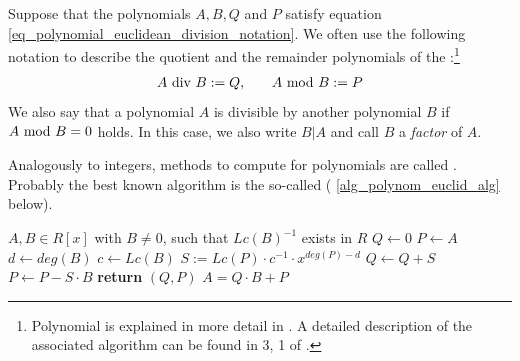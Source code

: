 \begin{notation}
\label{notation_polynomial_euclidean_division_notation}
Suppose that the polynomials $ A, B, Q $ and $ P $ satisfy equation \ref{eq_polynomial_euclidean_division_notation}. We often use the following notation to describe the quotient and the remainder polynomials of the :\footnote{Polynomial  is explained in more detail in \cite{mignotte-1992}. A detailed description of the associated algorithm can be found in \chaptname{} 3, \secname{} 1 of \cite{cohen-2010}. }
\begin{equation}
\label{def_polynomial_division_and_modulus}
\begin{array}{lcr}
A \text{ div } B: = Q, & & A \text{ mod } B: = P
\end{array}
\end{equation}
We also say that a polynomial $ A $ is divisible by another polynomial $ B $ if $ A \text{ mod } B = 0 $ holds. In this case, we also write $ B | A $ and call $B$ a \textit{factor} of $A$.
\end{notation}
Analogously to integers, methods to compute  for polynomials are called . Probably the best known algorithm is the so-called  (\algname{} \ref{alg_polynom_euclid_alg} below).
\begin{algorithm}\caption{Polynomial Euclidean Algorithm}
\label{alg_polynom_euclid_alg}
\begin{algorithmic}[0]
\Require $A,B \in R[x]$ with $B\neq 0$, such that $Lc(B)^{-1}$ exists in $R$
\State $Q \gets 0$
\State $P \gets A$
\State $d \gets deg(B)$
\State $c \gets Lc(B)$
\State  $S := Lc(P)\cdot c^{-1}\cdot x^{deg(P)-d}$
\State $Q \gets Q + S$
\State $P \gets P - S\cdot B$
\EndWhile
\State \textbf{return} $(Q, P)$
\EndProcedure
\Ensure $ A=  Q \cdot B + P$
\end{algorithmic}
\end{algorithm}

